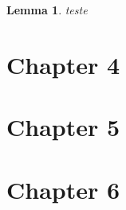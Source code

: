 \documentclass{book}
\newtheorem{lemma}{Lemma}
\begin{document}






\begin{lemma}
  teste
\end{lemma}



\chapter{Chapter 4}
\label{cha:chapter-4}


\chapter{Chapter 5}
\label{cha:chapter-5}

\chapter{Chapter 6}
\label{cha:chapter-6}

\end{document}
